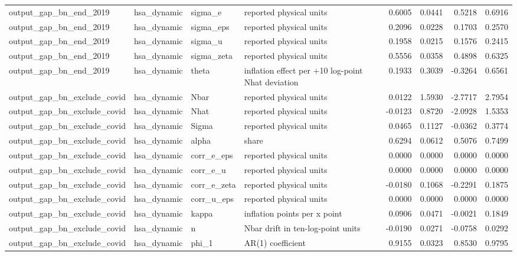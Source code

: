\begin{tabular}{llllrrrr}
output\_gap\_bn\_end\_2019 & hsa\_dynamic & sigma\_e & reported physical units & 0.6005 & 0.0441 & 0.5218 & 0.6916 \\
output\_gap\_bn\_end\_2019 & hsa\_dynamic & sigma\_eps & reported physical units & 0.2096 & 0.0228 & 0.1703 & 0.2570 \\
output\_gap\_bn\_end\_2019 & hsa\_dynamic & sigma\_u & reported physical units & 0.1958 & 0.0215 & 0.1576 & 0.2415 \\
output\_gap\_bn\_end\_2019 & hsa\_dynamic & sigma\_zeta & reported physical units & 0.5556 & 0.0358 & 0.4898 & 0.6325 \\
output\_gap\_bn\_end\_2019 & hsa\_dynamic & theta & inflation effect per +10 log-point Nhat deviation & 0.1933 & 0.3039 & -0.3264 & 0.6561 \\
output\_gap\_bn\_exclude\_covid & hsa\_dynamic & Nbar & reported physical units & 0.0122 & 1.5930 & -2.7717 & 2.7954 \\
output\_gap\_bn\_exclude\_covid & hsa\_dynamic & Nhat & reported physical units & -0.0123 & 0.8720 & -2.0928 & 1.5353 \\
output\_gap\_bn\_exclude\_covid & hsa\_dynamic & Sigma & reported physical units & 0.0465 & 0.1127 & -0.0362 & 0.3774 \\
output\_gap\_bn\_exclude\_covid & hsa\_dynamic & alpha & share & 0.6294 & 0.0612 & 0.5076 & 0.7499 \\
output\_gap\_bn\_exclude\_covid & hsa\_dynamic & corr\_e\_eps & reported physical units & 0.0000 & 0.0000 & 0.0000 & 0.0000 \\
output\_gap\_bn\_exclude\_covid & hsa\_dynamic & corr\_e\_u & reported physical units & 0.0000 & 0.0000 & 0.0000 & 0.0000 \\
output\_gap\_bn\_exclude\_covid & hsa\_dynamic & corr\_e\_zeta & reported physical units & -0.0180 & 0.1068 & -0.2291 & 0.1875 \\
output\_gap\_bn\_exclude\_covid & hsa\_dynamic & corr\_u\_eps & reported physical units & 0.0000 & 0.0000 & 0.0000 & 0.0000 \\
output\_gap\_bn\_exclude\_covid & hsa\_dynamic & kappa & inflation points per x point & 0.0906 & 0.0471 & -0.0021 & 0.1849 \\
output\_gap\_bn\_exclude\_covid & hsa\_dynamic & n & Nbar drift in ten-log-point units & -0.0190 & 0.0271 & -0.0758 & 0.0292 \\
output\_gap\_bn\_exclude\_covid & hsa\_dynamic & phi\_1 & AR(1) coefficient & 0.9155 & 0.0323 & 0.8530 & 0.9795 \\

\end{tabular}
